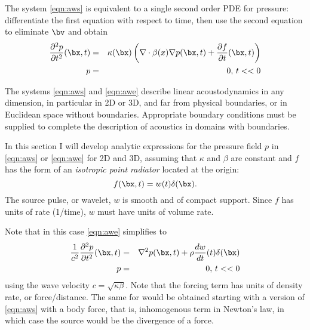 The system \ref{eqn:aws} is equivalent to a single second order PDE for pressure: differentiate the first equation with respect to time, then use the second equation to eliminate $\bv$ and obtain
\begin{eqnarray}
\label{eqn:awe}
\frac{\partial^2 p}{\partial t^2}(\bx,t) & = &\kappa(\bx)\left(\nabla \cdot \beta(x) \nabla p(\bx,t) + \frac{\partial f}{\partial t}(\bx,t)\right) \nonumber\\
p & = & 0, \,t<<0
\end{eqnarray}

The systems \ref{eqn:aws} and \ref{eqn:awe} describe linear acoustodynamics in any dimension, in particular in 2D or 3D, and far from physical boundaries, or in Euclidean space without boundaries. Appropriate boundary conditions must be supplied to complete the description of acoustics in  domains with boundaries. 

In this section I will develop analytic expressions for the pressure field $p$ in \ref{eqn:aws} or \ref{eqn:awe} for 2D and 3D, assuming that $\kappa$ and $\beta$ are constant and $f$ has the form of an {\em isotropic point radiator} located at the origin:
\begin{equation}
\label{eqn:ipr}
f(\bx,t) = w(t) \delta(\bx).
\end{equation}
The source pulse, or wavelet, $w$ is smooth and of compact support.
Since $f$ has units of rate (1/time), $w$ must have units of volume rate.

Note that in this case \ref{eqn:awe} simplifies to 
\begin{eqnarray}
\label{eqn:aweccipr}
\frac{1}{c^2}\frac{\partial^2 p}{\partial t^2}(\bx,t) & = &\nabla^2 p(\bx,t) + \rho\frac{dw}{dt}(t)\delta(\bx) \nonumber\\
p & = & 0, \,t<<0 
\end{eqnarray}
using the wave velocity $c=\sqrt{\kappa\beta}$. Note that the forcing term has units of density rate, or force/distance. The same for would be obtained starting with a version of \ref{eqn:aws} with a body force, that is, inhomogenous term in Newton's law, in which case the source would be the divergence of a force.

